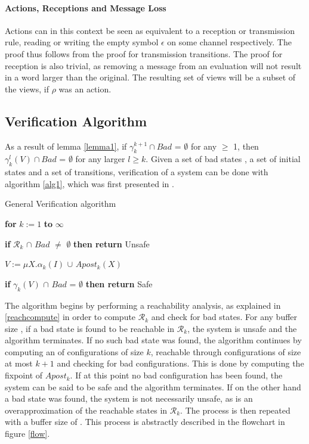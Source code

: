 \paragraph{Actions, Receptions and Message Loss}
\label{proofreception}
Actions can in this context be seen as equivalent to a reception or transmission rule, reading or writing the empty symbol $\epsilon$ on some channel respectively. The proof thus follows from the proof for transmission transitions. The proof for reception is also trivial, as removing a message from an evaluation will not result in a word larger than the original. The resulting set of views will be a subset of the views, if $\rho$ was an action.

\subsection{Verification Algorithm}
\label{verificationalgorithm}
As a result of lemma \ref{lemma1}, if $\gamma_k^{k+1} \cap Bad$ = $\emptyset$ for any  $\geq$ 1, then $\gamma_k^l(V) \cap Bad$ = $\emptyset$ for any larger $l \geq k$. Given a set of bad states , a set of initial states  and a set of transitions, verification of a system can be done with algorithm \ref{alg1}, which was first presented in \cite{parosh}.

\begin{algorithm}
  \caption{General Verification algorithm}
  \label{alg1}
    \hspace{8pt}\textbf{for} $k := 1$ \textbf{to} $\infty$

    \hspace{16pt}\textbf{if} $\mathcal{R}_k$ $\cap$ $Bad$ $\neq$ $\emptyset$ \textbf{then return} Unsafe

    \hspace{16pt}$V := \mu X.\alpha_k(I)$ $\cup$ $Apost_k(X)$

    \hspace{16pt}\textbf{if} {$\gamma_k(V)$ $\cap$ $Bad$ = $\emptyset$} \textbf{then return} Safe
\end{algorithm}

The algorithm begins by performing a reachability analysis, as explained in \ref{reachcompute} in order to compute $\mathcal{R}_k$ and check for bad states. For any buffer size , if a bad state is found to be reachable in $\mathcal{R}_k$, the system is unsafe and the algorithm terminates. If no such bad state was found, the algorithm continues by computing an  of configurations of size $k$, reachable through configurations of size at most $k+1$ and checking for bad configurations. This is done by computing the fixpoint of $Apost_k$. If at this point no bad configuration has been found, the system can be said to be safe and the algorithm terminates. If on the other hand a bad state was found, the system is not necessarily unsafe, as  is an overapproximation of the reachable states in $\mathcal{R}_k$. The process is then repeated with a buffer size of . This process is abstractly described in the flowchart in figure \ref{flow}.

